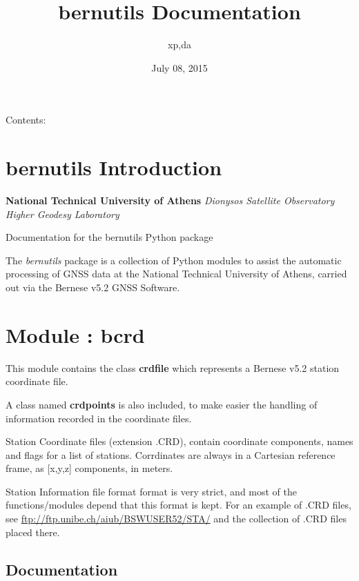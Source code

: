 \documentclass[letterpaper,10pt,english]{sphinxmanual}
\title{bernutils Documentation}
\date{July 08, 2015}
\author{xp,da}
\begin{document}
\maketitle
\tableofcontents
{}\label{index::doc}


Contents:


\chapter{bernutils Introduction}
\label{intro:bernutils-introduction}\label{intro:welcome-to-bernutils-s-documentation}\label{intro::doc}
\textbf{National Technical University of Athens}
\emph{Dionysos Satellite Observatory}
\emph{Higher Geodesy Laboratory}

Documentation for the bernutils Python package

The \emph{bernutils} package is a collection of Python modules to
assist the automatic processing of GNSS data at the
National Technical University of Athens, carried out via the
Bernese v5.2 GNSS Software.


\chapter{Module : bcrd}
\label{bcrd::doc}\label{bcrd:module-bcrd}
This module contains the class \textbf{crdfile} which represents a Bernese v5.2
station coordinate file.

A class named \textbf{crdpoints} is also included, to make easier the handling of
information recorded in the coordinate files.

Station Coordinate files (extension .CRD), contain coordinate components,
names and flags for a list of stations. Corrdinates are always in a
Cartesian reference frame, as {[}x,y,z{]} components, in meters.

Station Information file format format is very strict, and most of the
functions/modules depend that this format is kept. For an example of .CRD
files, see \href{ftp://ftp.unibe.ch/aiub/BSWUSER52/STA/}{ftp://ftp.unibe.ch/aiub/BSWUSER52/STA/} and the collection of .CRD
files placed there.


\section{Documentation}
\label{bcrd:documentation}
\end{document}
